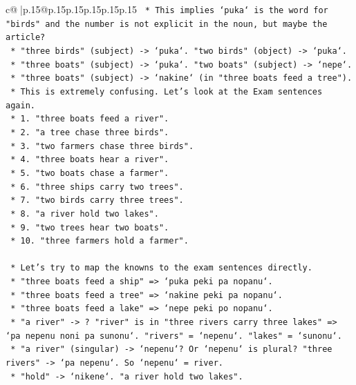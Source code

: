 \documentclass{article}
\begin{document}
{\begin{supertabular}{c@{$\;$}|p{.15\linewidth}@{}p{.15\linewidth}p{.15\linewidth}p{.15\linewidth}p{.15\linewidth}p{.15\linewidth}}
{{{\texttt{        *   This implies `puka` is the word for "birds" and the number is not explicit in the noun, but maybe the article?} \\
\texttt{        *   "three birds" (subject) {-}> `puka`. "two birds" (object) {-}> `puka`.} \\
\texttt{        *   "three boats" (subject) {-}> `puka`. "two boats" (subject) {-}> `nepe`.} \\
\texttt{        *   "three boats" (subject) {-}> `nakine` (in "three boats feed a tree").} \\
\texttt{        *   This is extremely confusing. Let's look at the Exam sentences again.} \\
\texttt{        *   1. "three boats feed a river".} \\
\texttt{        *   2. "a tree chase three birds".} \\
\texttt{        *   3. "two farmers chase three birds".} \\
\texttt{        *   4. "three boats hear a river".} \\
\texttt{        *   5. "two boats chase a farmer".} \\
\texttt{        *   6. "three ships carry two trees".} \\
\texttt{        *   7. "two birds carry three trees".} \\
\texttt{        *   8. "a river hold two lakes".} \\
\texttt{        *   9. "two trees hear two boats".} \\
\texttt{        *   10. "three farmers hold a farmer".} \\
\\ 
\texttt{    *   Let's try to map the knowns to the exam sentences directly.} \\
\texttt{    *   "three boats feed a ship" => `puka peki pa nopanu`.} \\
\texttt{    *   "three boats feed a tree" => `nakine peki pa nopanu`.} \\
\texttt{    *   "three boats feed a lake" => `nepe peki po nopanu`.} \\
\texttt{    *   "a river" {-}> ? "river" is in "three rivers carry three lakes" => `pa nepenu noni pa sunonu`. "rivers" = `nepenu`. "lakes" = `sunonu`.} \\
\texttt{    *   "a river" (singular) {-}> `nepenu`? Or `nepenu` is plural? "three rivers" {-}> `pa nepenu`. So `nepenu` = river.} \\
\texttt{    *   "hold" {-}> `nikene`. "a river hold two lakes".} \\
}}}
\end{supertabular}}
\end{document}
